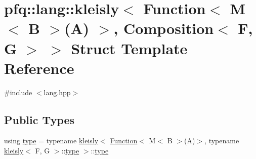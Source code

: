 \hypertarget{structpfq_1_1lang_1_1kleisly_3_01Function_3_01M_3_01B_01_4_07A_08_01_4_00_01Composition_3_01F_00_01G_01_4_01_4}{\section{pfq\+:\+:lang\+:\+:kleisly$<$ Function$<$ M$<$ B $>$(A) $>$, Composition$<$ F, G $>$ $>$ Struct Template Reference}
\label{structpfq_1_1lang_1_1kleisly_3_01Function_3_01M_3_01B_01_4_07A_08_01_4_00_01Composition_3_01F_00_01G_01_4_01_4}
}


{\ttfamily \#include $<$lang.\+hpp$>$}

\subsection*{Public Types}
\begin{DoxyCompactItemize}
\item 
using \hyperlink{structpfq_1_1lang_1_1kleisly_3_01Function_3_01M_3_01B_01_4_07A_08_01_4_00_01Composition_3_01F_00_01G_01_4_01_4_aa5c026817ce615e5e51ed76159b2e759}{type} = typename \hyperlink{structpfq_1_1lang_1_1kleisly}{kleisly}$<$ \hyperlink{structpfq_1_1lang_1_1Function}{Function}$<$ M$<$ B $>$(A)$>$, typename \hyperlink{structpfq_1_1lang_1_1kleisly}{kleisly}$<$ F, G $>$\+::\hyperlink{structpfq_1_1lang_1_1kleisly_3_01Function_3_01M_3_01B_01_4_07A_08_01_4_00_01Composition_3_01F_00_01G_01_4_01_4_aa5c026817ce615e5e51ed76159b2e759}{type} $>$\+::\hyperlink{structpfq_1_1lang_1_1kleisly_3_01Function_3_01M_3_01B_01_4_07A_08_01_4_00_01Composition_3_01F_00_01G_01_4_01_4_aa5c026817ce615e5e51ed76159b2e759}{type}
\end{DoxyCompactItemize}


